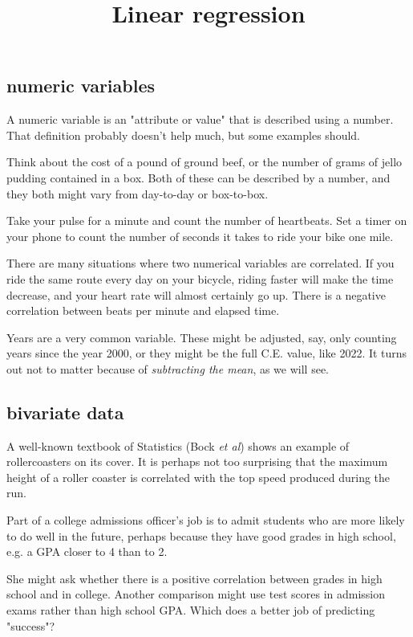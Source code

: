 \documentclass[11pt, oneside]{article}
\title{Linear regression}
\date{}
\begin{document}
\maketitle
\Large

\subsection*{numeric variables}

A numeric variable is an "attribute or value" that is described using a number.  That definition probably doesn't help much, but some examples should.

Think about the cost of a pound of ground beef, or the number of grams of jello pudding contained in a box.  Both of these can be described by a number, and they both might vary from day-to-day or box-to-box.

Take your pulse for a minute and count the number of heartbeats.  Set a timer on your phone to count the number of seconds it takes to ride your bike one mile.

There are many situations where two numerical variables are correlated.  If you ride the same route every day on your bicycle, riding faster will make the time decrease, and your heart rate will almost certainly go up.  There is a negative correlation between beats per minute and elapsed time.

Years are a very common variable.  These might be adjusted, say, only counting years since the year 2000, or they might be the full C.E. value, like 2022.  It turns out not to matter because of \emph{subtracting the mean}, as we will see.

\subsection*{bivariate data}

A well-known textbook of Statistics (Bock \emph{et al}) shows an example of rollercoasters on its cover.  It is perhaps not too surprising that the maximum height of a roller coaster is correlated with the top speed produced during the run.

Part of a college admissions officer's job is to admit students who are more likely to do well in the future, perhaps because they have good grades in high school, e.g. a GPA closer to 4 than to 2.

She might ask whether there is a positive correlation between grades in high school and in college.  Another comparison might use test scores in admission exams rather than high school GPA.  Which does a better job of predicting "success"?
\end{document}
